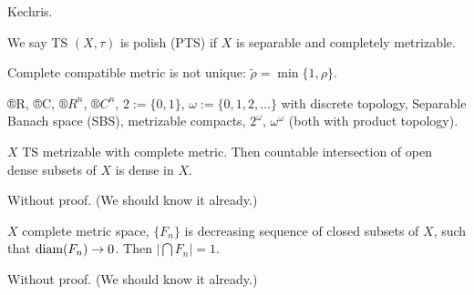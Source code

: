 \documentclass[12pt]{article}					%
\begin{document}

\begin{poznamka}[Literature]
	Kechris.
\end{poznamka}

\begin{definice}
	We say TS $(X, τ)$ is polish (PTS) if $X$ is separable and completely metrizable.
\end{definice}

\begin{poznamka}
	Complete compatible metric is not unique: $\tilde ρ = \min\{1, ρ\}$.
\end{poznamka}

\begin{priklady}
	®R, ®C, $®R^n$, $®C^n$, $2 := \{0, 1\}$, $ω := \{0, 1, 2, …\}$ with discrete topology, Separable Banach space (SBS), metrizable compacts, $2^ω$, $ω^ω$ (both with product topology).
\end{priklady}

\begin{veta}[Baire]
	$X$ TS metrizable with complete metric. Then countable intersection of open dense subsets of $X$ is dense in $X$.

	\begin{dukazin}
		Without proof. (We should know it already.)
	\end{dukazin}
\end{veta}

\begin{veta}
	$X$ complete metric space, $\{F_n\}$ is decreasing sequence of closed subsets of $X$, such that $\operatorname{diam}(F_n) \rightarrow 0$. Then $|\bigcap F_n| = 1$.

	\begin{dukazin}
		Without proof. (We should know it already.)
	\end{dukazin}
\end{veta}
\end{document}
